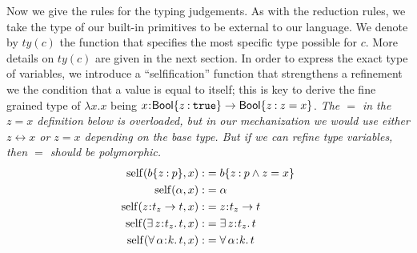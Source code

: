 \documentclass[11pt]{article}
\newcommand{\al}{\alpha}
\newcommand{\bind}{\hspace{0.05em}{:}\hspace{0.05em}} %
\newcommand{\col}{\mathbin{:}}       %
\newcommand{\true}{\mathtt{true}}
\newcommand{\Bool}{{\sf Bool}}
\newcommand{\existype}[3]{\exists\, #1\bind #2.\, #3}
\newcommand{\polytype}[3]{\forall\, #1\bind #2.\, #3}
\newcommand{\functype}[3]{#1\bind #2 \rightarrow #3}
\newcommand{\letin}[3]{{\tt let}\,#1\hspace{0.1em}{=}\hspace{0.1em}#2\,{\tt in}\,#3}
\begin{document}
Now we give the rules for the typing judgements. As with the reduction rules, we take the type of our built-in primitives to be external to our language. We denote by $ty(c)$ the function that specifies the most specific type possible for $c$. More details on $ty(c)$ are given in the next section.
In order to express the exact type of variables, we introduce a ``selfification'' function that strengthens a refinement we the condition that a value is equal to itself; this is key to derive the fine grained type of $\lambda x.x$ being $x\bind\Bool\{z\col \true\} \rightarrow \Bool\{z \col z = x\}$.
{\em The $=$ in the $z=x$ definition below is overloaded, but in our mechanization we would use either $z\leftrightarrow x$ or $z=x$ depending on the base type. But if we can refine type variables, then  $=$ should be polymorphic.}
\begin{align*}
{\rm self}(b\{z\col p\}, x):&= b\{z\col p \wedge z = x\} \\
{\rm self}(\al, x) :&= \al \\
{\rm self}(\functype{z}{t_z}{t}, x) :&= \functype{z}{t_z}{t} \\
{\rm self}(\existype{z}{t_z}{t}, x) :&= \existype{z}{t_z}{t} \\
{\rm self}(\polytype{\al}{k}{t}, x) :&= \polytype{\al}{k}{t} 
\end{align*}

\end{document}
